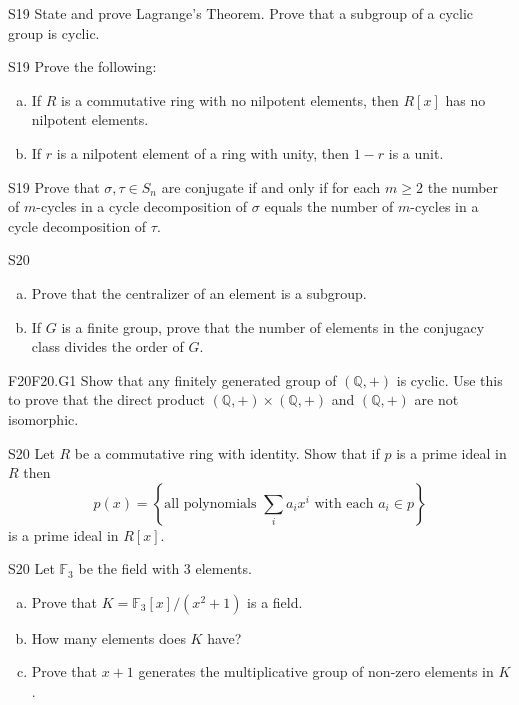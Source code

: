 \documentclass{article}
\newcommand{\Q}{\mathbb{Q}}
\newcommand{\F}{\mathbb{F}}
\theoremstyle{definition}
\begin{document}
	\begin{prob}{S19}{}
	State and prove Lagrange's Theorem. Prove that a subgroup of a cyclic group is cyclic.
	\end{prob}

	\begin{prob}{S19}{}
	Prove the following:
	\begin{enumerate}[(a)]
	\item If $R$ is a commutative ring with no nilpotent elements, then $R[x]$ has no nilpotent elements.
	\item If $r$ is a nilpotent element of a ring with unity, then $1 - r$ is a unit.
	\end{enumerate}
	\end{prob}
	

	
	\begin{prob}{S19}{}
	Prove that $\sigma,\tau \in S_n$ are conjugate if and only if for each $m \geq 2$ the number of $m$-cycles in a cycle decomposition of $\sigma$ equals the number of $m$-cycles in a cycle decomposition of $\tau$.
	\end{prob}
	
	\begin{prob}{S20}{}
	\begin{enumerate}[(a)]
	\item Prove that the centralizer of an element is a subgroup.
	\item If $G$ is a finite group, prove that the number of elements in the conjugacy class divides the order of $G$.
	\end{enumerate}
	\end{prob}
	
	\begin{prob}{F20}{F20.G1}
	Show that any finitely generated group of $(\Q,+)$ is cyclic. Use this to prove that the direct product $(\Q,+) \times (\Q,+)$ and $(\Q,+)$ are not isomorphic.
	\end{prob}

	\begin{prob}{S20}{}
	Let $R$ be a commutative ring with identity. Show that if $p$ is a prime ideal in $R$ then
		\[p(x) = \left\{\textrm{all polynomials } \sum_i a_ix^i \textrm{ with each } a_i \in p \right\} \]
	is a prime ideal in $R[x]$.
	\end{prob}
	
	\begin{prob}{S20}{}
	Let $\F_3$ be the field with 3 elements.
	\begin{enumerate}[(a)]
	\item Prove that $K = \F_3[x]/(x^2 + 1)$ is a field.
	\item How many elements does $K$ have?
	\item Prove that $x+1$ generates the multiplicative group of non-zero elements in $K$.
	\end{enumerate}
	\end{prob}
\end{document}
